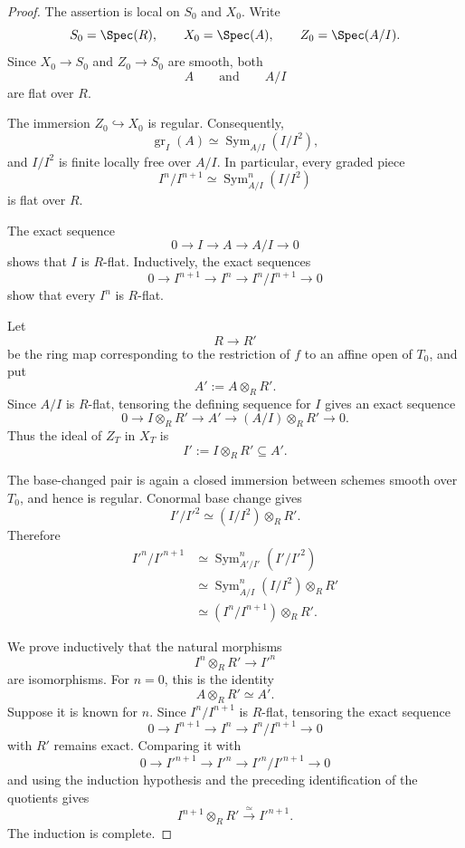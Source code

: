 \begin{proof}
The assertion is local on \(S_0\) and \(X_0\).  Write
\[
    S_0
    =
    \Spec(R),
    \qquad
    X_0
    =
    \Spec(A),
    \qquad
    Z_0
    =
    \Spec(A/I).
\]
Since \(X_0\to S_0\) and \(Z_0\to S_0\) are smooth, both
\[
    A
    \qquad\text{and}\qquad
    A/I
\]
are flat over \(R\).

The immersion \(Z_0\hookrightarrow X_0\) is regular.  Consequently,
\[
    \operatorname{gr}_I(A)
    \simeq
    \operatorname{Sym}_{A/I}(I/I^2),
\]
and \(I/I^2\) is finite locally free over \(A/I\).  In particular, every
graded piece
\[
    I^n/I^{n+1}
    \simeq
    \operatorname{Sym}_{A/I}^n(I/I^2)
\]
is flat over \(R\).

The exact sequence
\[
    0
    \longrightarrow
    I
    \longrightarrow
    A
    \longrightarrow
    A/I
    \longrightarrow
    0
\]
shows that \(I\) is \(R\)-flat.  Inductively, the exact sequences
\[
    0
    \longrightarrow
    I^{n+1}
    \longrightarrow
    I^n
    \longrightarrow
    I^n/I^{n+1}
    \longrightarrow
    0
\]
show that every \(I^n\) is \(R\)-flat.

Let
\[
    R
    \longrightarrow
    R'
\]
be the ring map corresponding to the restriction of \(f\) to an affine
open of \(T_0\), and put
\[
    A'
    :=
    A\otimes_RR'.
\]
Since \(A/I\) is \(R\)-flat, tensoring the defining sequence for \(I\)
gives an exact sequence
\[
    0
    \longrightarrow
    I\otimes_RR'
    \longrightarrow
    A'
    \longrightarrow
    (A/I)\otimes_RR'
    \longrightarrow
    0.
\]
Thus the ideal of \(Z_T\) in \(X_T\) is
\[
    I'
    :=
    I\otimes_RR'
    \subseteq
    A'.
\]

The base-changed pair is again a closed immersion between schemes
smooth over \(T_0\), and hence is regular.  Conormal base change gives
\[
    I'/I'^2
    \simeq
    (I/I^2)\otimes_RR'.
\]
Therefore
\[
\begin{aligned}
    I'^n/I'^{n+1}
    &\simeq
    \operatorname{Sym}_{A'/I'}^n(I'/I'^2)
    \\
    &\simeq
    \operatorname{Sym}_{A/I}^n(I/I^2)
    \otimes_RR'
    \\
    &\simeq
    (I^n/I^{n+1})\otimes_RR'.
\end{aligned}
\]

We prove inductively that the natural morphisms
\[
    I^n\otimes_RR'
    \longrightarrow
    I'^n
\]
are isomorphisms.  For \(n=0\), this is the identity
\[
    A\otimes_RR'
    \simeq
    A'.
\]
Suppose it is known for \(n\).  Since \(I^n/I^{n+1}\) is \(R\)-flat,
tensoring the exact sequence
\[
    0
    \longrightarrow
    I^{n+1}
    \longrightarrow
    I^n
    \longrightarrow
    I^n/I^{n+1}
    \longrightarrow
    0
\]
with \(R'\) remains exact.  Comparing it with
\[
    0
    \longrightarrow
    I'^{n+1}
    \longrightarrow
    I'^n
    \longrightarrow
    I'^n/I'^{n+1}
    \longrightarrow
    0
\]
and using the induction hypothesis and the preceding identification of
the quotients gives
\[
    I^{n+1}\otimes_RR'
    \xrightarrow{\simeq}
    I'^{n+1}.
\]
The induction is complete.


\end{proof}
